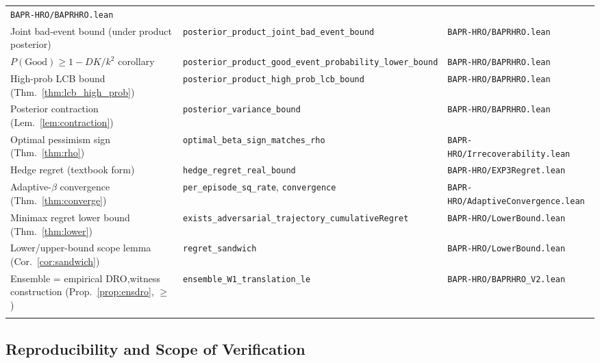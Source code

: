 \documentclass[11pt]{article}
\theoremstyle{definition}
\theoremstyle{remark}
\begin{document}
{\begin{longtable}{>{\raggedright\arraybackslash}p{4.0cm}>{\raggedright\arraybackslash}p{6.4cm}>{\raggedright\arraybackslash}p{3.4cm}}
  \texttt{BAPR-HRO/BAPRHRO.lean} \\
Joint bad-event bound (under product posterior) &
  \texttt{posterior\_product\_\allowbreak joint\_bad\_event\_\allowbreak bound} &
  \texttt{BAPR-HRO/BAPRHRO.lean} \\
$P(\mathrm{Good}) \geq 1 - DK/k^2$ corollary &
  \texttt{posterior\_product\_\allowbreak good\_event\_\allowbreak probability\_\allowbreak lower\_\allowbreak bound} &
  \texttt{BAPR-HRO/BAPRHRO.lean} \\
High-prob LCB bound (Thm.~\ref{thm:lcb_high_prob}) &
  \texttt{posterior\_product\_\allowbreak high\_prob\_\allowbreak lcb\_\allowbreak bound} &
  \texttt{BAPR-HRO/BAPRHRO.lean} \\
Posterior contraction (Lem.~\ref{lem:contraction}) &
  \texttt{posterior\_variance\_bound} &
  \texttt{BAPR-HRO/BAPRHRO.lean} \\
Optimal pessimism sign (Thm.~\ref{thm:rho}) &
  \texttt{optimal\_beta\_sign\_\allowbreak matches\_rho} &
  \texttt{BAPR-HRO/\allowbreak Irrecoverability.lean} \\
Hedge regret (textbook form) &
  \texttt{hedge\_regret\_real\_bound} &
  \texttt{BAPR-HRO/EXP3Regret.lean} \\
Adaptive-$\beta$ convergence (Thm.~\ref{thm:converge}) &
  \texttt{per\_episode\_sq\_rate},\newline
  \texttt{convergence} &
  \texttt{BAPR-HRO/\allowbreak AdaptiveConvergence.lean} \\
Minimax regret lower bound (Thm.~\ref{thm:lower}) &
  \texttt{exists\_adversarial\_\allowbreak trajectory\_\allowbreak cumulativeRegret} &
  \texttt{BAPR-HRO/LowerBound.lean} \\
Lower/upper-bound scope lemma (Cor.~\ref{cor:sandwich}) &
  \texttt{regret\_sandwich} &
  \texttt{BAPR-HRO/LowerBound.lean} \\
Ensemble = empirical DRO,\newline witness construction (Prop.~\ref{prop:ensdro}, $\geq$) &
  \texttt{ensemble\_W1\_\allowbreak translation\_le} &
  \texttt{BAPR-HRO/\allowbreak BAPRHRO\_V2.lean} \\
\multicolumn{2}{l}{\quad upper bound ($\leq$) reuses Thm.~\ref{thm:dro}} & \\
\bottomrule
\end{longtable}
}

\subsection{Reproducibility and Scope of Verification}
\label{sec:lean_scope}
\end{document}
